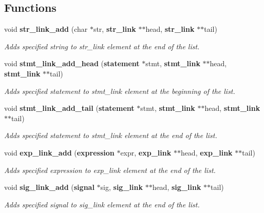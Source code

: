 \subsection*{Functions}
\begin{CompactItemize}
\item 
void {\bf str\_\-link\_\-add} (char $\ast$str, {\bf str\_\-link} $\ast$$\ast$head, {\bf str\_\-link} $\ast$$\ast$tail)
\begin{CompactList}\small\item\em Adds specified string to str\_\-link element at the end of the list. \item\end{CompactList}\item 
void {\bf stmt\_\-link\_\-add\_\-head} ({\bf statement} $\ast$stmt, {\bf stmt\_\-link} $\ast$$\ast$head, {\bf stmt\_\-link} $\ast$$\ast$tail)
\begin{CompactList}\small\item\em Adds specified statement to stmt\_\-link element at the beginning of the list. \item\end{CompactList}\item 
void {\bf stmt\_\-link\_\-add\_\-tail} ({\bf statement} $\ast$stmt, {\bf stmt\_\-link} $\ast$$\ast$head, {\bf stmt\_\-link} $\ast$$\ast$tail)
\begin{CompactList}\small\item\em Adds specified statement to stmt\_\-link element at the end of the list. \item\end{CompactList}\item 
void {\bf exp\_\-link\_\-add} ({\bf expression} $\ast$expr, {\bf exp\_\-link} $\ast$$\ast$head, {\bf exp\_\-link} $\ast$$\ast$tail)
\begin{CompactList}\small\item\em Adds specified expression to exp\_\-link element at the end of the list. \item\end{CompactList}\item 
void {\bf sig\_\-link\_\-add} ({\bf signal} $\ast$sig, {\bf sig\_\-link} $\ast$$\ast$head, {\bf sig\_\-link} $\ast$$\ast$tail)
\begin{CompactList}\small\item\em Adds specified signal to sig\_\-link element at the end of the list. \item\end{CompactList}\item 

\end{CompactItemize}
